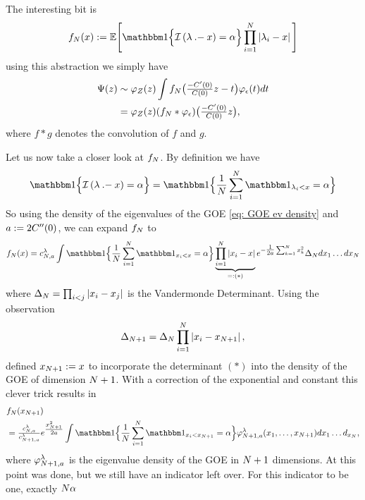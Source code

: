 The interesting bit is
\[
	f_\dimension(x):=\E\Bigg[
		\ind\Bigl\{
			\negEV\left(\evGOE \dotMinus x\right) = \alpha
		\Bigr\}
		\prod_{i=1}^\dimension \left|
			\evGOE_i - x
		\right|
	\Bigg]
\]
using this abstraction we simply have
\[\begin{aligned}
	\Psi(z)
	&\sim \varphi_Z(z)
	\int f_N\bigl(\tfrac{-C'(0)}{C(0)}z - t\bigr)
	\varphi_\epsilon(t)dt\\
	&= \varphi_Z(z)
	(f_N * \varphi_\epsilon)\bigl(\tfrac{-C'(0)}{C(0)}z\bigr),
\end{aligned}\]
where \(f*g\) denotes the convolution of \(f\) and \(g\).

Let us now take a closer look at \(f_N\). 
By definition we have
\[
		\ind\Bigl\{
			\negEV\left(\evGOE \dotMinus x\right) = \alpha
		\Bigr\}
		= \ind\Bigl\{
			\frac1\dimension\sum_{i=1}^\dimension \ind_{\evGOE_i < x} = \alpha
		\Bigr\}
\]
So using the density of the
eigenvalues of the GOE \eqref{eq: GOE ev density} and \(a:=2C''(0)\),
we can expand \(f_N\) to
\[
	f_\dimension(x)
	= c^\evGOE_{\dimension,a}\int
	\ind\Bigl\{
			\frac1\dimension\sum_{i=1}^\dimension \ind_{x_i < x} = \alpha
	\Bigr\}
	\underbrace{
	\prod_{i=1}^\dimension \left|
		x_i - x
	\right|
	}_{=:(*)}
	e^{-\tfrac1{2a}\sum_{k=1}^\dimension x_k^2} \Delta_N dx_1\dots dx_\dimension
\]
where \(\Delta_N = \prod_{i<j}|x_i-x_j|\) is the Vandermonde
Determinant. Using the observation
\[
	\Delta_{N+1} = 
	\Delta_N\prod_{i=1}^N \left|
		x_i - x_{N+1}
	\right|,
\]
\textcite{fyodorovComplexityRandomEnergy2004} defined \(x_{N+1}:=x\) to
incorporate the determinant \((*)\) into the density of the GOE of dimension
\(N+1\). With a correction of the exponential and constant this
clever trick results in
\[\begin{aligned}
	&f_\dimension(x_{\dimension+1})\\
	&= \tfrac{c^\evGOE_{\dimension, a}}{c^\evGOE_{\dimension+1,a}}
	e^{\tfrac{x_{\dimension+1}^2}{2a}}
	\int \ind\Bigl\{
			\frac1\dimension\sum_{i=1}^\dimension \ind_{x_i < x_{\dimension+1}} = \alpha
	\Bigr\}
	\varphi^\evGOE_{\dimension+1,a}(x_1,\dots,x_{\dimension+1})
	dx_1\dots d_{x_\dimension},
\end{aligned}\]
where \(\varphi^\lambda_{N+1,a}\) is the eigenvalue density of the GOE
in \(N+1\) dimensions. At this point
\textcite{fyodorovComplexityRandomEnergy2004} was done, but we still have an
indicator left over. For this indicator to be one, exactly \(N\alpha\)
